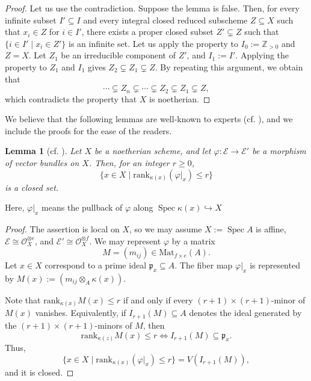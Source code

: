 \documentclass[a4paper,12pt]{amsart}
\newtheorem{lemma}[theorem]{Lemma}
\theoremstyle{definition} %
\theoremstyle{remark}
\numberwithin{equation}{section}
\newcommand{\Z}{\mathbb{Z}}
\def\Spec{\operatorname{Spec}}
\begin{document}
\begin{proof}
Let us use the contradiction. Suppose the lemma is false. Then, for every infinite subset $I'\subseteq I$ and every integral closed reduced subscheme $Z\subseteq X$ such that $x_i\in Z$ for $i\in I'$, there exists a proper closed subset $Z'\subsetneq Z$ such that $\{i\in I'\mid x_i\in Z'\}$ is an infinite set. Let us apply the property to $I_0:=\Z_{>0}$ and $Z=X$. Let $Z_1$ be an irreducible component of $Z'$, and $I_1:=I'$. Applying the property to $Z_1$ and $I_1$ gives $Z_2\subsetneq Z_1\subsetneq Z$. By repeating this argument, we obtain that
$$ \cdots \subsetneq Z_n\subsetneq \cdots \subsetneq Z_2\subsetneq Z_1\subsetneq Z,$$
which contradicts the property that $X$ is noetherian.
\end{proof}

We believe that the following lemmas are well-known to experts (cf. \cite[Section 3]{Pra88}), and we include the proofs for the ease of the readers.

\begin{lemma}[{cf. \cite[Section 3]{Pra88}}] \label{duidui}
Let $X$ be a noetherian scheme, and let $\varphi:\mathcal{E}\to \mathcal{E}'$ be a morphism of vector bundles on $X$. Then, for an integer $r\ge 0$,
$$ \{x\in X\mid \mathrm{rank}_{\kappa(x)}(\varphi|_x)\le r\}$$
is a closed set.
\end{lemma}

Here, $\varphi|_x$ means the pullback of $\varphi$ along $\Spec \kappa(x)\hookrightarrow X$

\begin{proof}
The assertion is local on $X$, so we may assume $X:=\Spec A$ is affine, $\mathcal{E}\cong \mathcal{O}^{\otimes e}_X$, and $\mathcal{E}'\cong \mathcal{O}^{\otimes f}_X$. We may represent $\varphi$ by a matrix
$$ M=(m_{ij})\in \mathrm{Mat}_{f\times e}(A).$$
Let $x\in X$ correspond to a prime ideal $\mathfrak{p}_x\subseteq A$. The fiber map $\varphi|_x$ is represented by $M(x):=(m_{ij}\otimes_A \kappa(x))$.

\smallskip

Note that $\mathrm{rank}_{\kappa(x)}M(x)\le r$ if and only if every $(r+1)\times (r+1)$-minor of $M(x)$ vanishes. Equivalently, if $I_{r+1}(M)\subseteq A$ denotes the ideal generated by the $(r+1)\times (r+1)$-minors of $M$, then
$$ \mathrm{rank}_{\kappa(z)}M(x)\le r\iff I_{r+1}(M)\subseteq \mathfrak{p}_x.$$
Thus,
$$ \{x\in X\mid \mathrm{rank}_{\kappa(x)}(\varphi|_x)\le r\}=V(I_{r+1}(M)),$$
and it is closed.
\end{proof}
\end{document}
